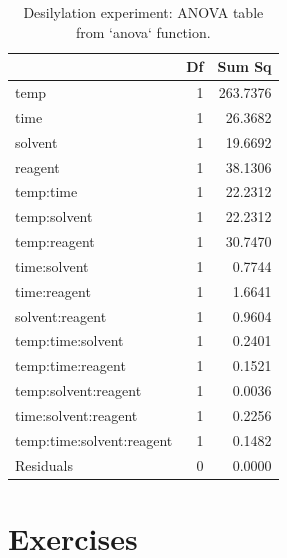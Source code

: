 \documentclass[
]{book}
\theoremstyle{definition}
\theoremstyle{definition}
\theoremstyle{definition}
\theoremstyle{definition}
\theoremstyle{remark}
\begin{document}
\begin{table}

\caption{\label{tab:desilylation-anova-ss}Desilylation experiment: ANOVA table from `anova` function.}
\centering
\begin{tabular}[t]{l|r|r}
\hline
  & Df & Sum Sq\\
\hline
temp & 1 & 263.7376\\
\hline
time & 1 & 26.3682\\
\hline
solvent & 1 & 19.6692\\
\hline
reagent & 1 & 38.1306\\
\hline
temp:time & 1 & 22.2312\\
\hline
temp:solvent & 1 & 22.2312\\
\hline
temp:reagent & 1 & 30.7470\\
\hline
time:solvent & 1 & 0.7744\\
\hline
time:reagent & 1 & 1.6641\\
\hline
solvent:reagent & 1 & 0.9604\\
\hline
temp:time:solvent & 1 & 0.2401\\
\hline
temp:time:reagent & 1 & 0.1521\\
\hline
temp:solvent:reagent & 1 & 0.0036\\
\hline
time:solvent:reagent & 1 & 0.2256\\
\hline
temp:time:solvent:reagent & 1 & 0.1482\\
\hline
Residuals & 0 & 0.0000\\
\hline
\end{tabular}
\end{table}

\hypertarget{exercises-2}{%
\section{Exercises}\label{exercises-2}}
\end{document}
